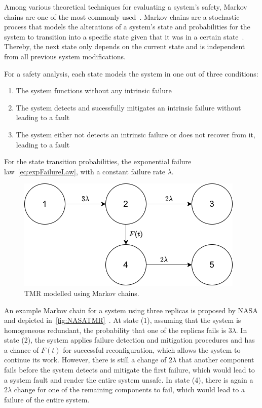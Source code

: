 Among various theoretical techniques for evaluating a system's safety, Markov chains are one of the most commonly used~\cite{BarryFaultToleranceAnalysis}.
Markov chains are a stochastic process that models the alterations of a system's state and probabilities for the system to transition into a specific state given that it was in a certain state~\cite{KemenyMarkovChains}.
Thereby, the next state only depends on the current state and is independent from all previous system modifications.

For a safety analysis, each state models the system in one out of three conditions:
\begin{enumerate}
\item The system functions without any intrinsic failure
\item The system detects and sucessfully mitigates an intrinsic failure without leading to a fault
\item The system either not detects an intrinsic failure or does not recover from it, leading to a fault
\end{enumerate}

For the state transition probabilities, the exponential failure law~\autoref{eq:expFailureLaw}, with a constant failure rate $\lambda$.

\begin{figure}[!hb]
	\centering
	\includegraphics[width=0.75\linewidth]{images/TriplexSystemNASA}
	\caption{\Gls*{TMR} modelled using Markov chains.}
	\label{fig:NASATMR}
\end{figure}

An example Markov chain for a system using three replicas is proposed by NASA and depicted in~\autoref{fig:NASATMR}~\cite{NASAMarkovChains}.
At state (1), assuming that the system is homogeneous redundant, the probability that one of the replicas fails is $3\lambda$.
In state (2), the system applies failure detection and mitigation procedures and has a chance of $F(t)$ for successful reconfiguration, which allows the system to continue its work.
However, there is still a change of $2\lambda$ that another component fails before the system detects and mitigate the first failure, which would lead to a system fault and render the entire system unsafe.
In state (4), there is again a $2\lambda$ change for one of the remaining components to fail, which would lead to a failure of the entire system.


